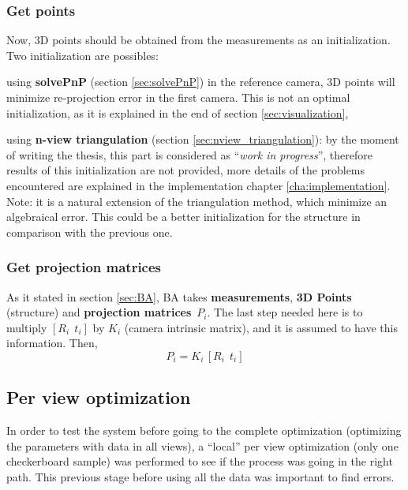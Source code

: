 \subsubsection*{Get points}

Now, 3D points should be obtained from the measurements as an initialization. Two initialization are possibles:
\begin{itemize*}
 \item using \textbf{solvePnP} (section \ref{sec:solvePnP}) in the reference camera, 3D points will minimize re-projection error in the first camera. This is not an optimal initialization, as it is explained in the end of section \ref{sec:visualization},

 \item using \textbf{n-view triangulation} (section \ref{sec:nview_triangulation}): by the moment of writing the thesis, this part is considered as ``\textit{work in progress}'', therefore results of this initialization are not provided, more details of the problems encountered are explained in the implementation chapter \ref{cha:implementation}. Note: it is a natural extension of the triangulation method, which minimize an algebraical error. This could be a better initialization for the structure in comparison with the previous one.
\end{itemize*}



\subsubsection*{Get projection matrices}

As it stated in section \ref{sec:BA}, BA takes \textbf{measurements}, \textbf{3D Points} (structure) and \textbf{projection matrices}~$P_i$. The last step needed here is to multiply $[R_i ~~ t_i]$ by $K_i$ (camera intrinsic matrix), and it is assumed to have this information. Then,
\[
 P_i = K_i \, [R_i ~~ t_i]
\]




\subsection{Per view optimization}

In order to test the system before going to the complete optimization (optimizing the parameters with data in all views), a ``local'' per view optimization (only one checkerboard sample) was performed to see if the process was going in the right path. This previous stage before using all the data was important to find errors.

